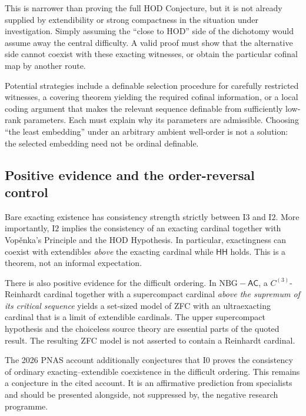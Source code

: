 \documentclass[11pt,letterpaper]{article}
\theoremstyle{definition}
\newcommand{\AC}{\mathsf{AC}}
\newcommand{\HH}{\mathsf{HH}}
\newcommand{\Izero}{\mathrm{I0}}
\newcommand{\Itwo}{\mathrm{I2}}
\newcommand{\Ithree}{\mathrm{I3}}
\begin{document}
This is narrower than proving the full HOD Conjecture, but it is not already supplied by extendibility or strong compactness in the situation under investigation. Simply assuming the ``close to HOD'' side of the dichotomy would assume away the central difficulty. A valid proof must show that the alternative side cannot coexist with these exacting witnesses, or obtain the particular cofinal map by another route.

Potential strategies include a definable selection procedure for carefully restricted witnesses, a covering theorem yielding the required cofinal information, or a local coding argument that makes the relevant sequence definable from sufficiently low-rank parameters. Each must explain why its parameters are admissible. Choosing ``the least embedding'' under an arbitrary ambient well-order is not a solution: the selected embedding need not be ordinal definable.

\subsection{Positive evidence and the order-reversal control}

Bare exacting existence has consistency strength strictly between $\Ithree$ and $\Itwo$. More importantly, $\Itwo$ implies the consistency of an exacting cardinal together with Vop\v enka's Principle and the HOD Hypothesis. In particular, exactingness can coexist with extendibles \emph{above} the exacting cardinal while $\HH$ holds. This is a theorem, not an informal expectation. \cite[Theorem~E; Corollaries~5.6 and~5.11]{abgl}

There is also positive evidence for the difficult ordering. In $\mathrm{NBG}-\AC$, a $C^{(3)}$-Reinhardt cardinal together with a supercompact cardinal \emph{above the supremum of its critical sequence} yields a set-sized model of ZFC with an ultraexacting cardinal that is a limit of extendible cardinals. The upper supercompact hypothesis and the choiceless source theory are essential parts of the quoted result. The resulting ZFC model is not asserted to contain a Reinhardt cardinal. \cite[Theorem~6.5]{abl}

The 2026 PNAS account additionally conjectures that $\Izero$ proves the consistency of ordinary exacting--extendible coexistence in the difficult ordering. This remains a conjecture in the cited account. It is an affirmative prediction from specialists and should be presented alongside, not suppressed by, the negative research programme. \cite[Conjecture~1(1)]{pnas}
\end{document}
